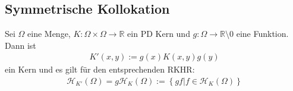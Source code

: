 \subsection{Symmetrische Kollokation}
\begin{theorem}
\label{thm:gewichtKern}
Sei $\Omega$ eine Menge, $K:\Omega \times \Omega \rightarrow \mathbb{R}$ ein \ac{PD} Kern und $g:\Omega \rightarrow \mathbb{R} \setminus {0}$ eine Funktion. Dann ist 
\begin{align*}
K'(x,y) := g(x)K(x,y)g(y)
\end{align*}
ein Kern und es gilt für den entsprechenden \ac{RKHR}:
\begin{align*}
\mathcal{H}_{K'}(\Omega) = g \mathcal{H}_K(\Omega) := \left\{ gf|f \in \mathcal{H}_K(\Omega)\right\}
\end{align*}
\end{theorem}
